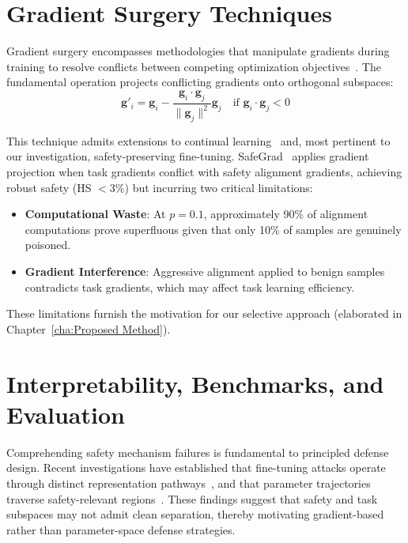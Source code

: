 \section{Gradient Surgery Techniques}
\label{sec:gradient_surgery_background}

Gradient surgery encompasses methodologies that manipulate gradients during training to resolve conflicts between competing optimization objectives~\cite{yu2020gradient}. The fundamental operation projects conflicting gradients onto orthogonal subspaces:
\begin{equation}
\mathbf{g}'_i = \mathbf{g}_i - \frac{\mathbf{g}_i \cdot \mathbf{g}_j}{\|\mathbf{g}_j\|^2} \mathbf{g}_j \quad \text{if } \mathbf{g}_i \cdot \mathbf{g}_j < 0
\end{equation}

This technique admits extensions to continual learning~\cite{farajtabar2020orthogonal, saha2021gradient} and, most pertinent to our investigation, safety-preserving fine-tuning. SafeGrad~\cite{yi2025safegrad} applies gradient projection when task gradients conflict with safety alignment gradients, achieving robust safety (HS $<3\%$) but incurring two critical limitations:

\begin{itemize}
    \item \textbf{Computational Waste}: At $p=0.1$, approximately 90\% of alignment computations prove superfluous given that only 10\% of samples are genuinely poisoned.
    \item \textbf{Gradient Interference}: Aggressive alignment applied to benign samples contradicts task gradients, which may affect task learning efficiency.
\end{itemize}

These limitations furnish the motivation for our selective approach (elaborated in Chapter~\ref{cha:Proposed Method}).

\section{Interpretability, Benchmarks, and Evaluation}
\label{sec:interpretability}

Comprehending safety mechanism failures is fundamental to principled defense design. Recent investigations have established that fine-tuning attacks operate through distinct representation pathways~\cite{rosati2024representation}, and that parameter trajectories traverse safety-relevant regions~\cite{pham2024navigating}. These findings suggest that safety and task subspaces may not admit clean separation, thereby motivating gradient-based rather than parameter-space defense strategies.

